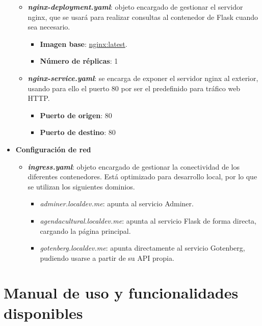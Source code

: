 \documentclass{report}
\begin{document}
\begin{itemize}
\begin{itemize}
                    \item \textit{\textbf{nginx-deployment.yaml}}: objeto encargado de gestionar el servidor nginx, que se usará para realizar consultas al contenedor de Flask cuando sea necesario.
                    \begin{itemize}
                        \item \textbf{Imagen base}: \href{https://hub.docker.com/_/nginx}{nginx:latest}.
                        \item \textbf{Número de réplicas}: 1
                    \end{itemize}
                    \item \textit{\textbf{nginx-service.yaml}}: se encarga de exponer el servidor nginx al exterior, usando para ello el puerto 80 por ser el predefinido para tráfico web HTTP.
                    \begin{itemize}
                        \item \textbf{Puerto de origen}: 80
                        \item \textbf{Puerto de destino}: 80
                    \end{itemize}
                \end{itemize}
                \item \textbf{Configuración de red}
                \begin{itemize}
                    \item \textit{\textbf{ingress.yaml}}: objeto encargado de gestionar la conectividad de los diferentes contenedores. Está optimizado para desarrollo local, por lo que se utilizan los siguientes dominios.
                    \begin{itemize}
                        \item \textit{adminer.localdev.me}: apunta al servicio Adminer.
                        \item \textit{agendacultural.localdev.me}: apunta al servicio Flask de forma directa, cargando la página principal.
                        \item \textit{gotenberg.localdev.me}: apunta directamente al servicio Gotenberg, pudiendo usarse a partir de su API propia.
                    \end{itemize}
                \end{itemize}
            \end{itemize}

    \chapter{Manual de uso y funcionalidades disponibles}
\end{document}
